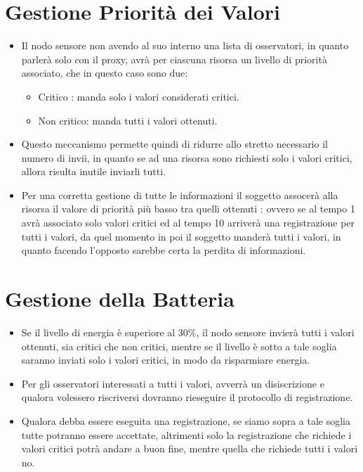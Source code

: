   \section{Gestione Priorità dei Valori}

    \begin{itemize}
      \item Il nodo sensore non avendo al suo interno una lista di osservatori, in quanto parlerà solo con il proxy, avrà per ciascuna risorsa un livello di priorità associato, che in questo caso sono due:

        \begin{itemize}
          \item Critico : manda solo i valori considerati critici.
          \item Non critico: manda tutti i valori ottenuti.
        \end{itemize}

      \item Questo meccanismo permette quindi di ridurre allo stretto necessario il numero di invii, in quanto se ad una risorsa sono richiesti solo i valori critici, allora risulta inutile inviarli tutti.
      \item Per una corretta gestione di tutte le informazioni il soggetto assocerà alla risorsa il valore di priorità più basso tra quelli ottenuti : ovvero se al tempo 1 avrà associato solo valori critici ed al tempo 10 arriverà una registrazione per tutti i valori, da quel momento in poi il soggetto manderà tutti i valori, in quanto facendo l’opposto sarebbe certa la perdita di informazioni.
    \end{itemize}

  \section{Gestione della Batteria}

    \begin{itemize}
      \item Se il livello di energia è superiore al 30\%, il nodo sensore invierà tutti i valori ottenuti, sia critici che non critici, mentre se il livello è sotto a tale soglia saranno inviati solo i valori critici, in modo da risparmiare energia.
      \item Per gli osservatori interessati a tutti i valori, avverrà un disiscrizione e qualora volessero riscriversi dovranno rieseguire il protocollo di registrazione.
      \item Qualora debba essere eseguita una registrazione, se siamo sopra a tale soglia tutte potranno essere accettate, altrimenti solo la registrazione che richiede i valori critici potrà andare a buon fine, mentre quella che richiede tutti i valori no.
    \end{itemize}

